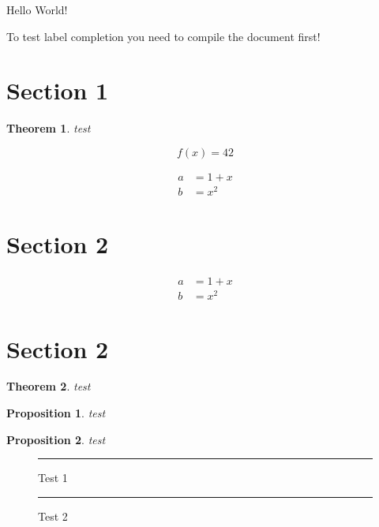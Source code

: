 \documentclass{article}
\numberwithin{equation}{section}
\newtheorem{theorem}{Theorem}
\newtheorem{proposition}{Proposition}
\begin{document}
Hello World!

To test label completion you need to compile the document first!

\section{Section 1}

\begin{theorem}
  \label{th:first}
  test
\end{theorem}

\begin{equation}
  f(x) = 42
  \label{eq:main-is-working}
\end{equation}

\begin{align}
  \label{eq:test1}
  a &= 1 + x \\
  \label{eq:aligned}
  b &= x^2
\end{align}

\section{Section 2}

\begin{subequations}
  \begin{align}
    \label{eq:sub1}
    a &= 1 + x \\
    \label{eq:sub2}
    b &= x^2
  \end{align}
\end{subequations}

\section{Section 2}

\begin{theorem}
  \label{th:second}
  test
\end{theorem}

\begin{proposition}
  \label{prop:first}
  test
\end{proposition}

\begin{proposition}
  \label{prop:second}
  test
\end{proposition}

\begin{figure}
  \centering
  \rule{1cm}{1cm}
  \caption{Test 1}
  \label{fig:test1}
\end{figure}

\begin{figure}
  \centering
  \rule{1cm}{1cm}
  \caption{Test 2}
  \label{fig:test2}
\end{figure}
\end{document}
